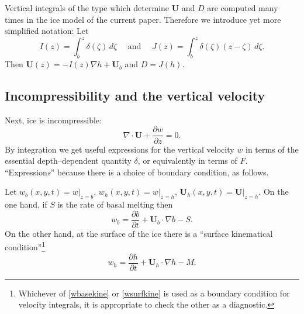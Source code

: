 \documentclass[12pt,final]{amsart}%
\theoremstyle{plain}
\theoremstyle{definition}
\theoremstyle{remark}
\newcommand{\ddt}[1]{\ensuremath{\frac{\partial #1}{\partial t}}}
\newcommand{\ddz}[1]{\ensuremath{\frac{\partial #1}{\partial z}}}
\newcommand{\diverg}{\nabla\cdot}
\newcommand{\grad}{\nabla}
\newcommand{\bU}{{\mathbf{U}}}
\begin{document}
Vertical integrals of the type which determine $\bU$ and $D$ are computed many times in the ice model of the current paper.  Therefore we introduce yet more simplified notation:  Let
    $$I(z)=\int_b^z \delta(\zeta)\,d\zeta \quad \text{ and } \quad J(z)=\int_b^z \delta(\zeta)(z-\zeta)\,d\zeta.$$
Then $\bU(z)=-I(z)\grad h + \bU_b$ and $D=J(h)$.


\subsection*{Incompressibility and the vertical velocity}\label{incompsubsect}  Next, ice is incompressible:
\begin{equation}\label{incomp}
\diverg \bU + \ddz{w}=0.
\end{equation}
By integration we get useful expressions for the vertical velocity $w$ in terms of the essential depth--dependent quantity $\delta$, or equivalently in terms of $F$.  ``Expression\emph{s}'' because there is a choice of boundary condition, as follows.

Let $w_b(x,y,t)=w\big|_{z=b}$, $w_h(x,y,t)=w\big|_{z=h}$, $\bU_h(x,y,t)=\bU\big|_{z=h}$.  On the one hand, if $S$ is the rate of basal melting then \citep{PayneDongelmans}
\begin{equation}\label{wbasekine}
w_b=\ddt{b}+ \bU_b\cdot\grad b - S.
\end{equation}
On the other hand, at the surface of the ice there is a ``surface kinematical condition''\footnote{Whichever of \eqref{wbasekine} or \eqref{wsurfkine} is used as a boundary condition for velocity integrals, it is appropriate to check the other as a diagnostic.}
\begin{equation}\label{wsurfkine}
w_h=\ddt{h}+ \bU_h\cdot\grad h - M.
\end{equation}
\end{document}
